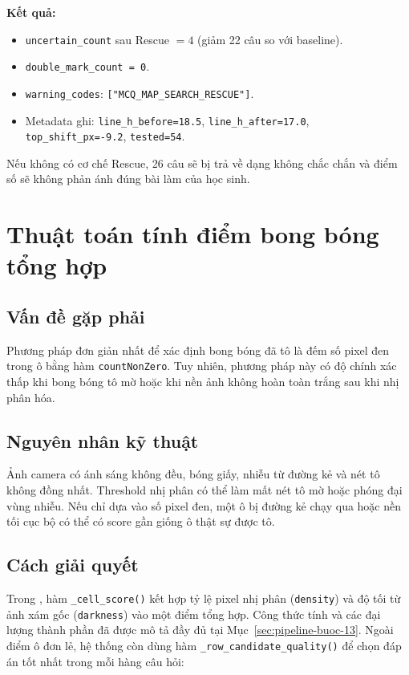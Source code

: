 \textbf{Kết quả:}
\begin{itemize}[leftmargin=1.5cm]
  \item \texttt{uncertain\_count} sau Rescue $= 4$ (giảm 22 câu so với baseline).
  \item \texttt{double\_mark\_count = 0}.
  \item \texttt{warning\_codes}: \texttt{["MCQ\_MAP\_SEARCH\_RESCUE"]}.
  \item Metadata ghi: \texttt{line\_h\_before=18.5}, \texttt{line\_h\_after=17.0}, \texttt{top\_shift\_px=-9.2}, \texttt{tested=54}.
\end{itemize}

Nếu không có cơ chế Rescue, 26 câu sẽ bị trả về dạng không chắc chắn và điểm số sẽ không phản ánh đúng bài làm của học sinh.

\section{Thuật toán tính điểm bong bóng tổng hợp}
\subsection{Vấn đề gặp phải}

Phương pháp đơn giản nhất để xác định bong bóng đã tô là đếm số pixel đen trong ô bằng hàm \texttt{countNonZero}. Tuy nhiên, phương pháp này có độ chính xác thấp khi bong bóng tô mờ hoặc khi nền ảnh không hoàn toàn trắng sau khi nhị phân hóa.

\subsection{Nguyên nhân kỹ thuật}

Ảnh camera có ánh sáng không đều, bóng giấy, nhiễu từ đường kẻ và nét tô không đồng nhất. Threshold nhị phân có thể làm mất nét tô mờ hoặc phóng đại vùng nhiễu. Nếu chỉ dựa vào số pixel đen, một ô bị đường kẻ chạy qua hoặc nền tối cục bộ có thể có score gần giống ô thật sự được tô.

\subsection{Cách giải quyết}

Trong , hàm \texttt{\_cell\_score()} kết hợp tỷ lệ pixel nhị phân (\texttt{density}) và độ tối từ ảnh xám gốc (\texttt{darkness}) vào một điểm tổng hợp. Công thức tính và các đại lượng thành phần đã được mô tả đầy đủ tại Mục~\ref{sec:pipeline-buoc-13}. Ngoài điểm ô đơn lẻ, hệ thống còn dùng hàm \texttt{\_row\_candidate\_quality()} để chọn đáp án tốt nhất trong mỗi hàng câu hỏi:

